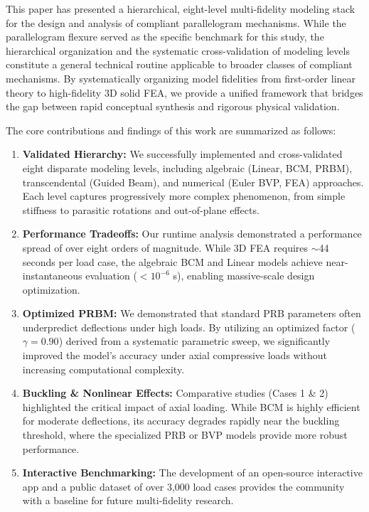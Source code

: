 \documentclass[colorlinks,upint,subscriptcorrection,varvw,hyphenate,balance]{asmeconf} %
\begin{document}
This paper has presented a hierarchical, eight-level multi-fidelity modeling stack for the design and analysis of compliant parallelogram mechanisms. While the parallelogram flexure served as the specific benchmark for this study, the hierarchical organization and the systematic cross-validation of modeling levels constitute a general technical routine applicable to broader classes of compliant mechanisms. By systematically organizing model fidelities from first-order linear theory to high-fidelity 3D solid FEA, we provide a unified framework that bridges the gap between rapid conceptual synthesis and rigorous physical validation. 

The core contributions and findings of this work are summarized as follows:
\begin{enumerate}
    \item \textbf{Validated Hierarchy:} We successfully implemented and cross-validated eight disparate modeling levels, including algebraic (Linear, BCM, PRBM), transcendental (Guided Beam), and numerical (Euler BVP, FEA) approaches. Each level captures progressively more complex phenomenon, from simple stiffness to parasitic rotations and out-of-plane effects.
    \item \textbf{Performance Tradeoffs:} Our runtime analysis demonstrated a performance spread of over eight orders of magnitude. While 3D FEA requires $\sim$44 seconds per load case, the algebraic BCM and Linear models achieve near-instantaneous evaluation ($<10^{-6}$ s), enabling massive-scale design optimization.
    \item \textbf{Optimized PRBM:} We demonstrated that standard PRB parameters often underpredict deflections under high loads. By utilizing an optimized factor ($\gamma = 0.90$) derived from a systematic parametric sweep, we significantly improved the model's accuracy under axial compressive loads without increasing computational complexity.
    \item \textbf{Buckling \& Nonlinear Effects:} Comparative studies (Cases 1 \& 2) highlighted the critical impact of axial loading. While BCM is highly efficient for moderate deflections, its accuracy degrades rapidly near the buckling threshold, where the specialized PRB or BVP models provide more robust performance.
    \item \textbf{Interactive Benchmarking:} The development of an open-source interactive app and a public dataset of over 3,000 load cases provides the community with a baseline for future multi-fidelity research.
\end{enumerate}
\end{document}
